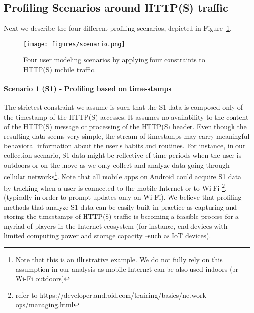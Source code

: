 \subsection{Profiling Scenarios around HTTP(S) traffic}
Next we describe the four different profiling scenarios, depicted in Figure~\ref{fig:one}.

\begin{figure}
  \texttt{[image: figures/scenario.png]}
  \caption{Four user modeling scenarios by applying four constraints to HTTP(S) mobile traffic.}
  \label{fig:one}
\end{figure}

\paragraph{Scenario 1 (S1) - Profiling based on time-stamps} 
The strictest constraint we assume is such that the S1 data is composed only of the timestamp of the HTTP(S) accesses. It assumes no availability to the content of the HTTP(S) message or processing of the HTTP(S) header. Even though the resulting data seems very simple, the stream of timestamps may carry meaningful behavioral information about the user's habits and routines. For instance, in our collection scenario, S1 data might be reflective of time-periods when the user is outdoors or on-the-move as we only collect and analyze data going through cellular networks\footnote{Note that this is an illustrative example. We do not fully rely on this assumption in our analysis as mobile Internet can be also used indoors (or Wi-Fi outdoors)}. 
Note that all mobile apps on Android could acquire S1 data by tracking when a user is connected to the mobile Internet or to Wi-Fi \footnote{refer to https://developer.android.com/training/basics/network-ops/managing.html}.
(typically in order to prompt updates only on Wi-Fi). We believe that profiling methods that analyze S1 data can be easily built in practice as capturing and storing the timestamps of HTTP(S) traffic is becoming a feasible process for a myriad of players in the Internet ecosystem (for instance, end-devices with limited computing power and storage capacity --such as IoT devices). 

